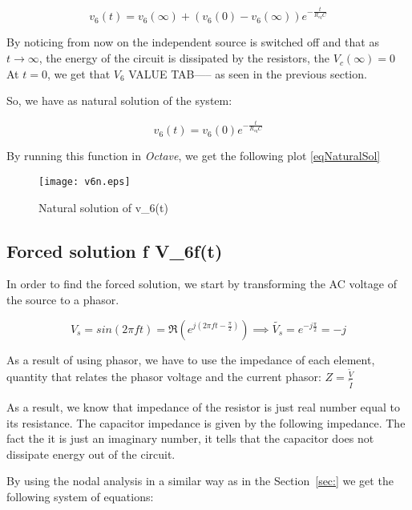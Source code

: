 \begin{equation}

  v_6 (t) = v_6(\infty) + (v_6(0) - v_6(\infty)) e^{-\frac{t}{R_{eq}C}}
\end{equation}


By noticing from now on the independent source is switched off and that as $t \rightarrow \infty$, the energy of the circuit is dissipated by the resistors, the $V_c(\infty) = 0$
At $t = 0$, we get that $V_6$ VALUE TAB----- as seen in the previous section.

So, we have as natural solution of the system:

\begin{equation}

  v_6 (t) = v_6(0)e^{-\frac{t}{R_{eq}C}}
  \label{eqNaturalSol}
\end{equation}

By running this function in \textit{Octave}, we get the following plot \ref{eqNaturalSol}

\begin{figure}[h] \centering
  \texttt{[image: v6n.eps]}
  \caption{Natural solution of v_6(t) }
  \label{fig:naturalSolution}
\end{figure}


\subsection{Forced solution f V_{6f}(t)}

In order to find the forced solution, we start by transforming the AC voltage of the source to a phasor.

\begin{equation}
  V_s = sin(2\pi f t) = \Re (e^{j(2\pi f t - \frac{\pi}{2})}) \implies \tilde{V_s} = e^{-j \frac{\pi}{2}} = -j
\end{equation}

As a result of using phasor, we have to use the impedance of each element, quantity that relates the phasor voltage and the current phasor: $Z = \frac{\tilde{V}}{\tilde{I}} $

As a result, we know that impedance of the resistor is just real number equal to its resistance. The capacitor impedance is given by the following impedance.
The fact the it is just an imaginary number, it tells that the capacitor does not dissipate energy out of the circuit.

By using the nodal analysis in a similar way as in the Section~\ref{sec:} we get the following system of equations:

